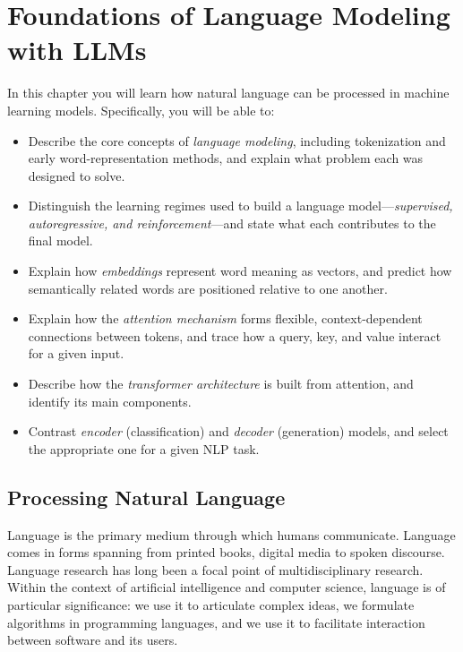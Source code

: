 


\chapter[Foundations of Language Modeling]{Foundations of Language Modeling with LLMs}\label{chap:llm}

\begin{learningbox}
In this chapter you will learn how  natural language can be processed in machine learning models. 
Specifically, you will be able to:
\begin{itemize}[leftmargin=*, nosep]
    \item Describe the core concepts of {\em language modeling}, including tokenization and early word-representation methods, and explain what problem each was designed to solve.
    \item Distinguish the learning regimes used to build a language model---{\em supervised, autoregressive, and reinforcement}---and state what each contributes to the final model.
    \item Explain how {\em embeddings} represent word meaning as vectors, and predict how semantically related words are positioned relative to one another.
    \item Explain how the {\em attention mechanism} forms flexible, context-dependent connections between tokens, and trace how a query, key, and value interact for a given input.
    \item Describe how the {\em transformer architecture} is built from attention, and identify its main components.
    \item Contrast {\em encoder} (classification) and {\em decoder} (generation) models, and select the appropriate one for a given NLP task.
\end{itemize}
\end{learningbox}

\section{Processing Natural Language}\label{sec:processinglanguage}
Language is the primary medium through which humans communicate. Language comes in forms spanning from printed books, digital media to spoken discourse. Language research  has long been a focal point of multidisciplinary research. Within the context of artificial intelligence and computer science, language is of particular significance: we use it to articulate complex ideas, we formulate algorithms in programming languages, and we use it to facilitate interaction between software and its users.

